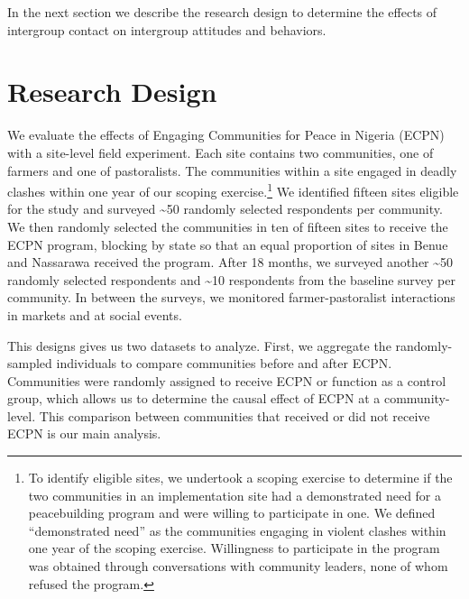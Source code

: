 \documentclass[11pt]{article}
\begin{document}
In the next section we describe the research design to determine the
effects of intergroup contact on intergroup attitudes and behaviors.

\hypertarget{research-design}{%
\section{Research Design}\label{research-design}}

We evaluate the effects of Engaging Communities for Peace in Nigeria
(ECPN) with a site-level field experiment. Each site contains two
communities, one of farmers and one of pastoralists. The communities
within a site engaged in deadly clashes within one year of our scoping
exercise.\footnote{To identify eligible sites, we undertook a scoping
  exercise to determine if the two communities in an implementation site
  had a demonstrated need for a peacebuilding program and were willing
  to participate in one. We defined ``demonstrated need'' as the
  communities engaging in violent clashes within one year of the scoping
  exercise. Willingness to participate in the program was obtained
  through conversations with community leaders, none of whom refused the
  program.} We identified fifteen sites eligible for the study and
surveyed \textasciitilde{}50 randomly selected respondents per
community. We then randomly selected the communities in ten of fifteen
sites to receive the ECPN program, blocking by state so that an equal
proportion of sites in Benue and Nassarawa received the program. After
18 months, we surveyed another \textasciitilde{}50 randomly selected
respondents and \textasciitilde{}10 respondents from the baseline survey
per community. In between the surveys, we monitored farmer-pastoralist
interactions in markets and at social events.

This designs gives us two datasets to analyze. First, we aggregate the
randomly-sampled individuals to compare communities before and after
ECPN. Communities were randomly assigned to receive ECPN or function as
a control group, which allows us to determine the causal effect of ECPN
at a community-level. This comparison between communities that received
or did not receive ECPN is our main analysis.
\end{document}
